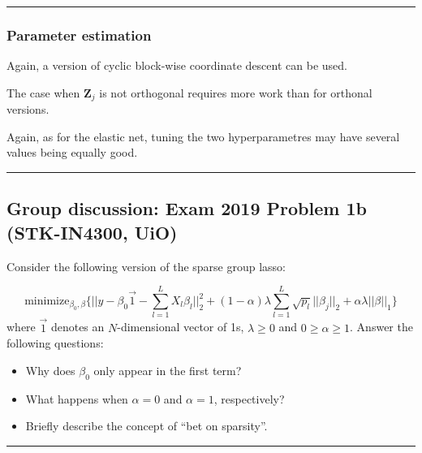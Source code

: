 \documentclass[
  letterpaper,
  DIV=11,
  numbers=noendperiod]{scrartcl}
\providecommand{\tightlist}{%
  \setlength{\itemsep}{0pt}\setlength{\parskip}{0pt}}\usepackage{longtable,booktabs,array}
\begin{document}
\begin{center}\rule{0.5\linewidth}{0.5pt}\end{center}

\hypertarget{parameter-estimation-2}{%
\subsubsection{Parameter estimation}\label{parameter-estimation-2}}

Again, a version of cyclic block-wise coordinate descent can be used.

The case when \(\boldsymbol Z_j\) is not orthogonal requires more work
than for orthonal versions.

Again, as for the elastic net, tuning the two hyperparametres may have
several values being equally good.

\begin{center}\rule{0.5\linewidth}{0.5pt}\end{center}

\hypertarget{group-discussion-exam-2019-problem-1b-stk-in4300-uio}{%
\subsection{Group discussion: Exam 2019 Problem 1b (STK-IN4300,
UiO)}\label{group-discussion-exam-2019-problem-1b-stk-in4300-uio}}

Consider the following version of the sparse group lasso:

\[\text{minimize}_{\beta_0,\beta} \{ \lvert \lvert y-\beta_0 \overrightarrow{1}-\sum_{l=1}^L X_{l}\beta_l {\rvert \rvert}^2_2 + (1-\alpha)\lambda \sum_{l=1}^L\sqrt{p_l}\lvert \lvert \beta_j {\rvert \rvert}_2 + \alpha \lambda \lvert\lvert \beta{\rvert \rvert}_1\}\]
where \(\overrightarrow{1}\) denotes an \(N\)-dimensional vector of 1s,
\(\lambda \ge0\) and \(0\ge \alpha \ge 1\). Answer the following
questions:

\begin{itemize}
\tightlist
\item
  Why does \(\beta_0\) only appear in the first term?
\item
  What happens when \(\alpha=0\) and \(\alpha=1\), respectively?
\item
  Briefly describe the concept of ``bet on sparsity''.
\end{itemize}

\begin{center}\rule{0.5\linewidth}{0.5pt}\end{center}
\end{document}
